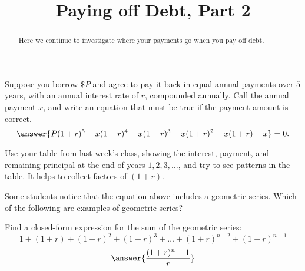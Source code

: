 \documentclass[handout,space,nooutcomes]{ximera}
\title{Paying off Debt, Part 2}
\begin{document}
\begin{abstract}
Here we continue to investigate where your payments go when you pay off debt.
\end{abstract}
\maketitle


\begin{question}
Suppose you borrow $\$P$ and agree to pay it back in equal annual
payments over $5$ years, with an annual interest rate of $r$, compounded annually.  
Call the annual payment $x$, and write an equation that must be true if
the payment amount is correct.
\[
\answer{P(1+r)^5-x(1+r)^4 -x(1+r)^3-x(1+r)^2 - x(1+r) -x} = 0.
\]

\begin{hint}
Use your table from last week's class, showing the interest, payment, and remaining
principal at the end of years $1, 2, 3, \dots$, and try to see
patterns in the table.  It helps to collect factors of $(1+r)$.
\end{hint} 

\end{question}


\begin{question}
Some students notice that the equation above includes a geometric
series.  Which of the following are examples of geometric series?
\begin{multipleChoice}
  \choice[correct]{$0.151515151515\dots$}
\end{multipleChoice}

\end{question}

\begin{question}
  Find a closed-form expression for the sum of the geometric series:
  \[
  1 + (1+r) + (1+r)^2 + (1+r)^3 + \dots + (1+r)^{n-2}+ (1+r)^{n-1}
  \]
  \[
  \answer{\frac{(1+r)^n-1}{r}}
  \]
\end{question}

\end{document}
